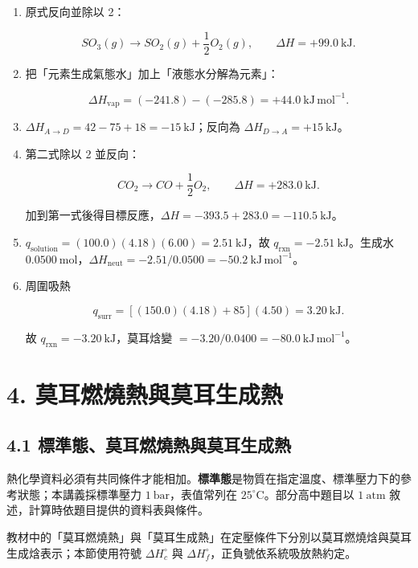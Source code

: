 \documentclass[11pt,a4paper]{article}
\begin{document}
\begin{enumerate}
\def\labelenumi{\arabic{enumi}.}
\item
  原式反向並除以 2：

  \[
  SO_3(g)\rightarrow SO_2(g)+\frac12O_2(g),
  \qquad \Delta H=+99.0\ \mathrm{kJ}.
  \]
\item
  把「元素生成氣態水」加上「液態水分解為元素」：

  \[
  \Delta H_{\text{vap}}=(-241.8)-(-285.8)=+44.0\ \mathrm{kJ\,mol^{-1}}.
  \]
\item
  \(\Delta H_{A\to D}=42-75+18=-15\ \mathrm{kJ}\)；反向為 \(\Delta H_{D\to A}=+15\ \mathrm{kJ}\)。
\item
  第二式除以 2 並反向：

  \[
  CO_2\rightarrow CO+\frac12O_2,\qquad \Delta H=+283.0\ \mathrm{kJ}.
  \]

  加到第一式後得目標反應，\(\Delta H=-393.5+283.0=-110.5\ \mathrm{kJ}\)。
\item
  \(q_{\text{solution}}=(100.0)(4.18)(6.00)=2.51\ \mathrm{kJ}\)，故 \(q_{\text{rxn}}=-2.51\ \mathrm{kJ}\)。生成水 \(0.0500\ \mathrm{mol}\)，\(\Delta H_{\text{neut}}=-2.51/0.0500=-50.2\ \mathrm{kJ\,mol^{-1}}\)。
\item
  周圍吸熱

  \[
  q_{\text{surr}}=[(150.0)(4.18)+85](4.50)=3.20\ \mathrm{kJ}.
  \]

  故 \(q_{\text{rxn}}=-3.20\ \mathrm{kJ}\)，莫耳焓變 \(=-3.20/0.0400=-80.0\ \mathrm{kJ\,mol^{-1}}\)。
\end{enumerate}

\section{4. 莫耳燃燒熱與莫耳生成熱}\label{ux83abux8033ux71c3ux71d2ux71b1ux8207ux83abux8033ux751fux6210ux71b1}

\subsection{4.1 標準態、莫耳燃燒熱與莫耳生成熱}\label{ux6a19ux6e96ux614bux83abux8033ux71c3ux71d2ux71b1ux8207ux83abux8033ux751fux6210ux71b1}

熱化學資料必須有共同條件才能相加。\textbf{標準態}是物質在指定溫度、標準壓力下的參考狀態；本講義採標準壓力 \(1\ \mathrm{bar}\)，表值常列在 \(25^\circ\mathrm C\)。部分高中題目以 \(1\ \mathrm{atm}\) 敘述，計算時依題目提供的資料表與條件。

教材中的「莫耳燃燒熱」與「莫耳生成熱」在定壓條件下分別以莫耳燃燒焓與莫耳生成焓表示；本節使用符號 \(\Delta H_c^\circ\) 與 \(\Delta H_f^\circ\)，正負號依系統吸放熱約定。
\end{document}
